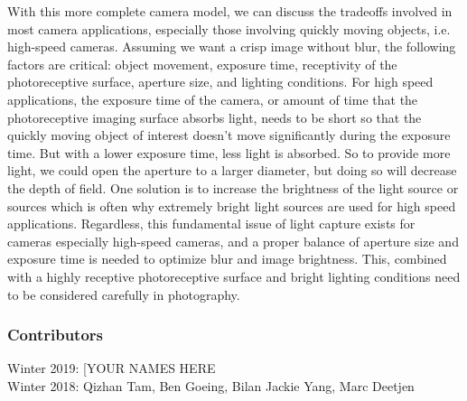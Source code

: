With this more complete camera model, we can discuss the tradeoffs involved in most camera applications, especially those involving quickly moving objects, i.e. high-speed cameras. Assuming we want a crisp image without blur, the following factors are critical: object movement, exposure time, receptivity of the photoreceptive surface, aperture size, and lighting conditions. For high speed applications, the exposure time of the camera, or amount of time that the photoreceptive imaging surface absorbs light, needs to be short so that the quickly moving object of interest doesn't move significantly during the exposure time. But with a lower exposure time, less light is absorbed. So to provide more light, we could open the aperture to a larger diameter, but doing so will decrease the depth of field. One solution is to increase the brightness of the light source or sources which is often why extremely bright light sources are used for high speed applications. Regardless, this fundamental issue of light capture exists for cameras especially high-speed cameras, and a proper balance of aperture size and exposure time is needed to optimize blur and image brightness. This, combined with a highly receptive photoreceptive surface and bright lighting conditions need to be considered carefully in photography.



\subsubsection*{Contributors}
Winter 2019: [YOUR NAMES HERE
\\
Winter 2018: Qizhan Tam, Ben Goeing, Bilan Jackie Yang, Marc Deetjen


